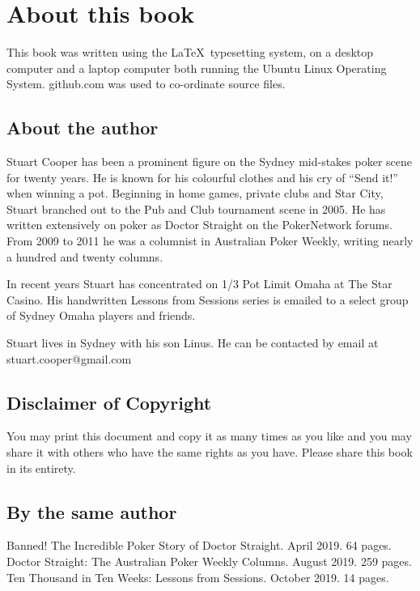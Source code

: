 \chapter*{About this book}


This book was written using the \LaTeX\ typesetting system, on a
desktop computer and a laptop computer both running the Ubuntu
Linux Operating System. github.com was used to co-ordinate source
files.

\section*{About the author}

Stuart Cooper has been a prominent figure on the Sydney mid-stakes poker
scene for twenty years. He is known for his colourful clothes
and his cry of ``Send it!'' when winning a pot.
Beginning in home games, private clubs
and Star City, Stuart branched out to the Pub and Club tournament
scene in 2005. He has written extensively on poker
as Doctor Straight on the PokerNetwork forums. From
2009 to 2011 he was a columnist in Australian Poker Weekly,
writing nearly a hundred and twenty columns.

In recent years Stuart has concentrated on 1/3 Pot Limit Omaha at
The Star Casino. His handwritten Lessons from Sessions series is
emailed to a select group of Sydney Omaha players and friends.

Stuart lives in Sydney with his son Linus. He
can be contacted by email at stuart.cooper@gmail.com

\section*{Disclaimer of Copyright}

You may print this document and copy it as many times as you like and
you may share it with others who have the same rights as you
have. Please share this book in its entirety.

\section*{By the same author}

Banned! The Incredible Poker Story of Doctor Straight. April 2019. 64 pages.\\
Doctor Straight: The Australian Poker Weekly Columns. August 2019. 259 pages.\\
Ten Thousand in Ten Weeks: Lessons from Sessions. October 2019. 14 pages.
